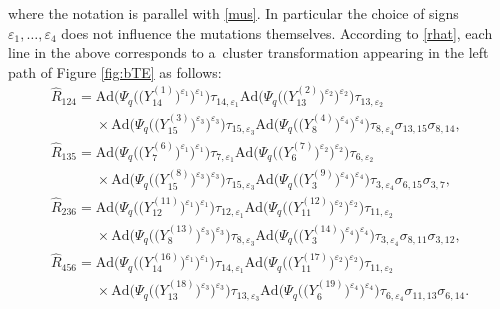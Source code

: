 \documentclass[11pt]{article}
\numberwithin{equation}{section}
\numberwithin{equation}{section}
\begin{document}
where the notation is parallel with \eqref{mus}. In particular the
choice of signs $\varepsilon_1, \dots, \varepsilon_4$ does not
influence the mutations themselves.
%
According to \eqref{rhat}, each line in the above corresponds to a~cluster transformation appearing in the left path of
Figure \ref{fig:bTE} as follows:
\begin{gather}
\widehat{R}_{124} =
\mathrm{Ad}\bigl(\Psi_q\bigl(\bigl(Y^{(1)}_{14}\bigr)^{\varepsilon_1}\bigr)^{\varepsilon_1}\bigr)\tau_{14,\varepsilon_1}
\mathrm{Ad}\bigl(\Psi_q\bigl(\bigl(Y^{(2)}_{13}\bigr)^{\varepsilon_2}\bigr)^{\varepsilon_2}\bigr)\tau_{13,\varepsilon_2}\nonumber
\\
\phantom{\widehat{R}_{124} =}{} \times
\mathrm{Ad}\bigl(\Psi_q\bigl(\bigl(Y^{(3)}_{15}\bigr)^{\varepsilon_3}\bigr)^{\varepsilon_3}\bigr)\tau_{15,\varepsilon_3}
\mathrm{Ad}\bigl(\Psi_q\bigl(\bigl(Y^{(4)}_{8}\bigr)^{\varepsilon_4}\bigr)^{\varepsilon_4}\bigr)\tau_{8,\varepsilon_4}
\sigma_{13,15}\sigma_{8,14},\nonumber
\\
\widehat{R}_{135} =
\mathrm{Ad}\bigl(\Psi_q\bigl(\bigl(Y^{(6)}_{7}\bigr)^{\varepsilon_1}\bigr)^{\varepsilon_1}\bigr)\tau_{7,\varepsilon_1}
\mathrm{Ad}\bigl(\Psi_q\bigl(\bigl(Y^{(7)}_{6}\bigr)^{\varepsilon_2}\bigr)^{\varepsilon_2}\bigr)\tau_{6,\varepsilon_2}\nonumber
\\
\phantom{\widehat{R}_{135} =}{} \times
\mathrm{Ad}\bigl(\Psi_q\bigl(\bigl(Y^{(8)}_{15}\bigr)^{\varepsilon_3}\bigr)^{\varepsilon_3}\bigr)\tau_{15,\varepsilon_3}
\mathrm{Ad}\bigl(\Psi_q\bigl(\bigl(Y^{(9)}_{3}\bigr)^{\varepsilon_4}\bigr)^{\varepsilon_4}\bigr)\tau_{3,\varepsilon_4}
\sigma_{6,15}\sigma_{3,7},\nonumber
\\
\widehat{R}_{236} =
\mathrm{Ad}\bigl(\Psi_q\bigl(\bigl(Y^{(11)}_{12}\bigr)^{\varepsilon_1}\bigr)^{\varepsilon_1}\bigr)\tau_{12,\varepsilon_1}
\mathrm{Ad}\bigl(\Psi_q\bigl(\bigl(Y^{(12)}_{11}\bigr)^{\varepsilon_2}\bigr)^{\varepsilon_2}\bigr)\tau_{11,\varepsilon_2}\nonumber
\\
\phantom{\widehat{R}_{236} =}{} \times
\mathrm{Ad}\bigl(\Psi_q\bigl(\bigl(Y^{(13)}_{8}\bigr)^{\varepsilon_3}\bigr)^{\varepsilon_3}\bigr)\tau_{8,\varepsilon_3}
\mathrm{Ad}\bigl(\Psi_q\bigl(\bigl(Y^{(14)}_{3}\bigr)^{\varepsilon_4}\bigr)^{\varepsilon_4}\bigr)\tau_{3,\varepsilon_4}
\sigma_{8,11}\sigma_{3,12},\nonumber
\\
\widehat{R}_{456} =
\mathrm{Ad}\bigl(\Psi_q\bigl(\bigl(Y^{(16)}_{14}\bigr)^{\varepsilon_1}\bigr)^{\varepsilon_1}\bigr)\tau_{14,\varepsilon_1}
\mathrm{Ad}\bigl(\Psi_q\bigl(\bigl(Y^{(17)}_{11}\bigr)^{\varepsilon_2}\bigr)^{\varepsilon_2}\bigr)\tau_{11,\varepsilon_2}\nonumber
\\
\phantom{\widehat{R}_{456} =}{} \times
\mathrm{Ad}\bigl(\Psi_q\bigl(\bigl(Y^{(18)}_{13}\bigr)^{\varepsilon_3}\bigr)^{\varepsilon_3}\bigr)\tau_{13,\varepsilon_3}
\mathrm{Ad}\bigl(\Psi_q\bigl(\bigl(Y^{(19)}_{6}\bigr)^{\varepsilon_4}\bigr)^{\varepsilon_4}\bigr)\tau_{6,\varepsilon_4}
\sigma_{11,13}\sigma_{6,14}.\label{r124a}
\end{gather}
\end{document}

